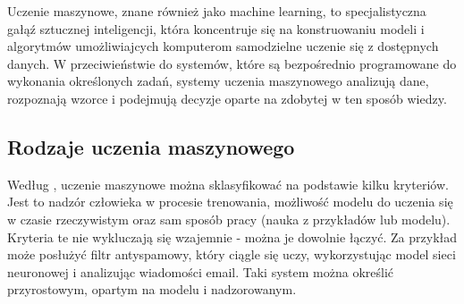 Uczenie maszynowe, znane również jako machine learning, to specjalistyczna gałąź sztucznej inteligencji,
która koncentruje się na konstruowaniu modeli i algorytmów umożliwiajcych komputerom samodzielne uczenie się z dostępnych danych.
W przeciwieństwie do systemów, które są bezpośrednio programowane do wykonania określonych zadań,
systemy uczenia maszynowego analizują dane, rozpoznają wzorce i podejmują decyzje oparte na zdobytej w ten sposób wiedzy.

\subsection{Rodzaje uczenia maszynowego}
Według \cite{Geron2020}, uczenie maszynowe można sklasyfikować na podstawie kilku kryteriów.
Jest to nadzór człowieka w procesie trenowania, możliwość modelu do uczenia się w czasie rzeczywistym
oraz sam sposób pracy (nauka z przykładów lub modelu). Kryteria te nie wykluczają się wzajemnie - można je dowolnie łączyć.
Za przykład może posłużyć filtr antyspamowy, który ciągle się uczy,
wykorzystując model sieci neuronowej i analizując wiadomości email.
Taki system można określić przyrostowym, opartym na modelu i nadzorowanym.

